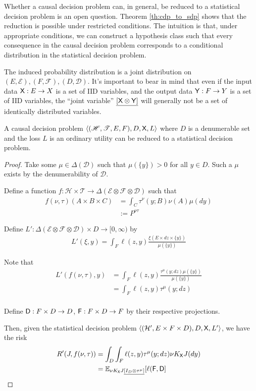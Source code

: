 Whether a causal decision problem can, in general, be reduced to a statistical decision problem is an open question. Theorem \ref{th:cdp_to_sdp} shows that the reduction is possible under restricted conditions. The intuition is that, under appropriate conditions, we can construct a hypothesis class such that every consequence in the causal decision problem corresponds to a conditional distribution in the statistical decision problem.

The induced probability distribution is a joint distribution on $(E,\mathcal{E}),(F,\mathcal{F}),(D,\mathcal{D})$. It's important to bear in mind that even if the input data $\mathsf{X}:E\to X$ is a set of IID variables, and the output data $\mathsf{Y}:F\to Y$ is a set of IID variables, the ``joint variable'' $\underline{[\mathsf{X}\otimes\mathsf{Y}]}$ will generally not be a set of identically distributed variables.

\begin{theorem}\label{th:cdp_to_sdp}
A causal decision problem $\langle (\mathscr{H},\mathscr{T},E,F),D,\mathsf{X},L\rangle$ where $D$ is a denumerable set and the loss $L$ is an ordinary utility can be reduced to a statistical decision problem.
\end{theorem}

\begin{proof}
Take some $\mu\in \Delta(\mathcal{D})$ such that $\mu(\{y\})>0$ for all $y\in D$. Such a $\mu$ exists by the denumerability of $\mathcal{D}$.

Define a function $f:\mathscr{H}\times\mathscr{T}\to \Delta(\mathcal{E}\otimes\mathcal{F}\otimes\mathcal{D})$ such that
\begin{align}
    f(\nu,\tau)(A\times B\times C)&=\int_C \tau^\nu(y;B) \nu(A)\mu(dy)\\
                                  &:=P^{\nu\tau}
\end{align}

Define $L':\Delta(\mathcal{E}\otimes\mathcal{F}\otimes\mathcal{D})\times D\to[0,\infty)$ by
\begin{align}
    L'(\xi,y) = \int_F \ell(z,y) \frac{\xi(E\times dz\times\{y\})}{\mu(\{y\})}
\end{align}

Note that
\begin{align}
    L'(f(\nu,\tau),y) &= \int_{F} \ell(z,y)  \frac{ \tau^{\mu}(y;dz)\mu(\{y\})}{\mu(\{y\})}\\
                      &= \int_F \ell(z,y) \tau^{\mu}(y;dz) \\
\end{align}

Define $\mathsf{D}:F\times D\to D$, $\mathsf{F}:F\times D\to F$ by their respective projections.

Then, given the statistical decision problem $\langle(\mathcal{H}',E\times F\times D),D,\mathsf{X},L'\rangle$, we have the risk
\begin{align}
    R'(J,f(\nu,\tau)) &= \int_D \int_F \ell(z,y) \tau^\mu(y;dz)  \nu K_{\mathsf{X}} J(dy) \\
                      &= \mathbb{E}_{\nu K_{\mathsf{X}} J\underline{[I_D\otimes \tau^\mu]}}[\ell(\mathsf{F},\mathsf{D}]
\end{align}
\end{proof}

